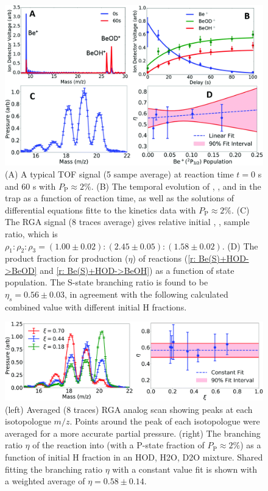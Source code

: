 \begin{figure}
	\centering
	\includegraphics[width=\textwidth]{images/Be_HOD_set.png}
	\caption{(A) A typical TOF signal (5 sampe average) at reaction time $t=0$ s and 60 s with $P_{\text{P}} \approx 2\%$. (B) The temporal evolution of , , and  in the trap as a function of reaction time, as well as the solutions of differential equations fitte to the kinetics data with $P_{\text{P}} \approx 2\%$. (C) The RGA signal (8 traces average) gives relative initial , ,  sample ratio, which is $\rho_1:\rho_2:\rho_3=(1.00 \pm 0.02):(2.45 \pm 0.05):(1.58 \pm 0.02)$. (D) The product fraction for  production ($\eta$) of reactions (\ref{r: Be(S)+HOD->BeOD} and \ref{r: Be(S)+HOD->BeOH}) as a function of  state population. The S-state branching ratio is found to be $\eta_s=0.56 \pm 0.03$, in agreement with the following calculated combined value with different initial H fractions.}
\end{figure}

\begin{figure}[H]
	\centering
	\includegraphics[width=\textwidth]{images/Be_HOD_HOD_frac.png}
	\caption{(left) Averaged (8 traces) RGA analog scan showing peaks at each isotopologue $m/z$. Points around the peak of each isotopologue were averaged for a more accurate partial pressure. (right) The branching ratio $\eta$ of the reaction  into  (with a  P-state fraction of $P_{\text{P}} \approx 2\%$) as a function of initial H fraction in an HOD, H2O, D2O mixture. Shared fitting the branching ratio $\eta$ with a constant value fit is shown with a weighted average of $\eta = 0.58 \pm 0.14$.}
	\label{}
\end{figure}

